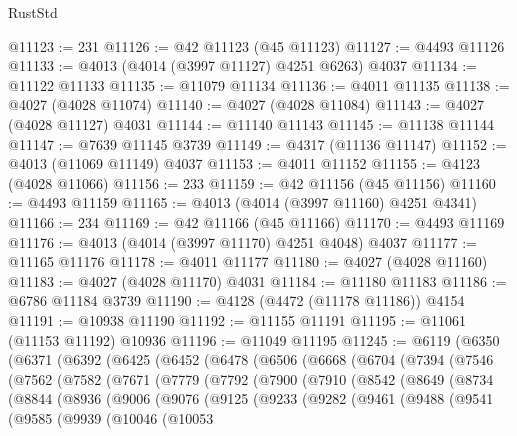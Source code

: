 \begin{lexlean}{RustStd}
\begin{coremodule}
@11123 := 231
@11126 := @42 @11123 (@45 @11123)
@11127 := @4493 @11126
@11133 := @4013 (@4014 (@3997 @11127) @4251 @6263) @4037
@11134 := @11122 @11133
@11135 := @11079 @11134
@11136 := @4011 @11135
@11138 := @4027 (@4028 @11074)
@11140 := @4027 (@4028 @11084)
@11143 := @4027 (@4028 @11127) @4031
@11144 := @11140 @11143
@11145 := @11138 @11144
@11147 := @7639 @11145 @3739
@11149 := @4317 (@11136 @11147)
@11152 := @4013 (@11069 @11149) @4037
@11153 := @4011 @11152
@11155 := @4123 (@4028 @11066)
@11156 := 233
@11159 := @42 @11156 (@45 @11156)
@11160 := @4493 @11159
@11165 := @4013 (@4014 (@3997 @11160) @4251 @4341)
@11166 := 234
@11169 := @42 @11166 (@45 @11166)
@11170 := @4493 @11169
@11176 := @4013 (@4014 (@3997 @11170) @4251 @4048) @4037
@11177 := @11165 @11176
@11178 := @4011 @11177
@11180 := @4027 (@4028 @11160)
@11183 := @4027 (@4028 @11170) @4031
@11184 := @11180 @11183
@11186 := @6786 @11184 @3739
@11190 := @4128 (@4472 (@11178 @11186)) @4154
@11191 := @10938 @11190
@11192 := @11155 @11191
@11195 := @11061 (@11153 @11192) @10936
@11196 := @11049 @11195
@11245 := @6119
    (@6350
      (@6371
        (@6392
          (@6425
            (@6452
              (@6478
                (@6506
                  (@6668
                    (@6704
                      (@7394
                        (@7546
                          (@7562
                            (@7582
                              (@7671
                                (@7779
                                  (@7792
                                    (@7900
                                      (@7910
                                        (@8542
                                          (@8649
                                            (@8734
                                              (@8844
                                                (@8936
                                                  (@9006
                                                    (@9076
                                                      (@9125
                                                        (@9233
                                                          (@9282
                                                            (@9461
                                                              (@9488
                                                                (@9541
                                                                  (@9585
                                                                    (@9939
                                                                      (@10046
                                                                        (@10053

\end{coremodule}
\end{lexlean}
